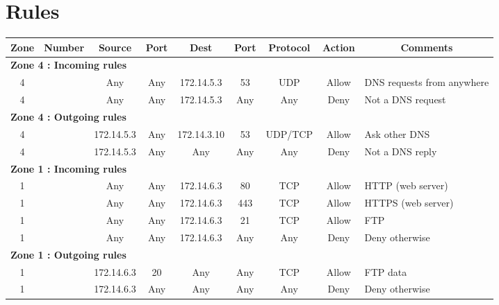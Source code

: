 \documentclass[a4paper,titlepage]{article}
\begin{document}
\section{Rules}
\label{sec:Rules}

\begin{landscape}
	\vspace*{\fill}
	\begin{table}[h]
		\center
		\begin{tabular}{c|c|cc|cc|ccl}
			Zone & Number & Source & Port & Dest & Port & Protocol & Action & \multicolumn{1}{c}{Comments}\\

			\hline
			\multicolumn{9}{l}{\textbf{Zone 4 : Incoming rules}}\\
			4 &  & Any & Any & 172.14.5.3 & 53 & UDP & Allow & DNS requests from anywhere\\
			4 &  & Any & Any & 172.14.5.3 & Any & Any & Deny & Not a DNS request\\

			\hline
			\multicolumn{9}{l}{\textbf{Zone 4 : Outgoing rules}}\\
			4 &  & 172.14.5.3 & Any & 172.14.3.10 & 53 & UDP/TCP & Allow & Ask other DNS\\
			4 &  & 172.14.5.3 & Any & Any & Any & Any & Deny & Not a DNS reply\\

			\hline
			\multicolumn{9}{l}{\textbf{Zone 1 : Incoming rules}}\\
			1 &  & Any & Any & 172.14.6.3 & 80 & TCP & Allow & HTTP (web server)\\
			1 &  & Any & Any & 172.14.6.3 & 443 & TCP & Allow & HTTPS (web server)\\
			1 &  & Any & Any & 172.14.6.3 & 21 & TCP & Allow & FTP\\
			1 &  & Any & Any & 172.14.6.3 & Any & Any & Deny & Deny otherwise\\

			\hline
			\multicolumn{9}{l}{\textbf{Zone 1 : Outgoing rules}}\\
			1 &  & 172.14.6.3 & 20 & Any & Any & TCP & Allow & FTP data\\
			1 &  & 172.14.6.3 & Any & Any & Any & Any & Deny & Deny otherwise\\


\end{tabular}
\end{table}
\end{landscape}
\end{document}
